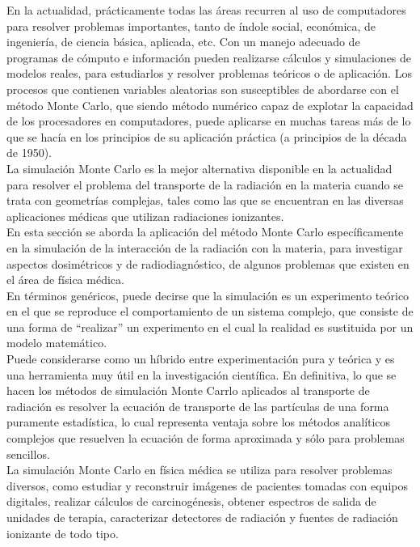 En la actualidad, pr\'acticamente todas las \'areas recurren al uso de computadores para resolver problemas importantes,
tanto de \'indole social, econ\'omica, de ingenier\'ia, de ciencia b\'asica, aplicada, etc. 
%
Con un manejo adecuado de programas de c\'omputo e informaci\'on pueden realizarse c\'alculos y simulaciones de modelos reales,
para estudiarlos y resolver problemas te\'oricos o de aplicaci\'on.
%
Los procesos que contienen variables aleatorias son susceptibles de abordarse con el m\'etodo Monte Carlo, que siendo m\'etodo 
num\'erico capaz de explotar la capacidad de los procesadores en computadores, puede aplicarse en muchas tareas m\'as de lo que se 
hac\'ia en los principios de su aplicaci\'on pr\'actica (a principios de la d\'ecada de 1950). \\
%
%
La simulaci\'on Monte Carlo es la mejor alternativa disponible en la actualidad para resolver el problema del transporte de la 
radiaci\'on en la materia cuando se trata con geometr\'ias complejas, tales como las que se encuentran en las diversas aplicaciones
m\'edicas que utilizan radiaciones ionizantes. \\
%
%
En esta secci\'on se aborda la aplicaci\'on del m\'etodo Monte Carlo espec\'ificamente en la simulaci\'on de la interacci\'on de
la radiaci\'on con la materia, para investigar aspectos dosim\'etricos y de radiodiagn\'ostico, de algunos problemas que existen en el
\'area de f\'isica m\'edica. \\
%
%
En t\'erminos gen\'ericos, puede decirse que la simulaci\'on es un experimento te\'orico en el que se reproduce el comportamiento de
un sistema complejo, que consiste de una forma de ``realizar'' un experimento en el cual la realidad es sustituida por un modelo 
matem\'atico.\\ 
%
%
Puede considerarse como un h\'ibrido entre experimentaci\'on pura y te\'orica y es una herramienta muy \'util en la investigaci\'on 
cient\'ifica.
%
En definitiva, lo que se hacen los m\'etodos de simulaci\'on Monte Carrlo aplicados al transporte de radiaci\'on es resolver la ecuaci\'on 
de transporte de las part\'iculas de una forma puramente estad\'istica, lo cual representa ventaja sobre los m\'etodos anal\'iticos 
complejos que resuelven la ecuaci\'on de forma aproximada y s\'olo para problemas sencillos. \\
%
%
La simulaci\'on Monte Carlo en f\'isica m\'edica se utiliza para resolver problemas diversos, como estudiar y reconstruir im\'agenes de 
pacientes tomadas con equipos digitales, realizar c\'alculos de carcinog\'enesis, obtener espectros de salida de unidades de terapia, 
caracterizar detectores de radiaci\'on  y fuentes de radiaci\'on ionizante de todo tipo. \\




